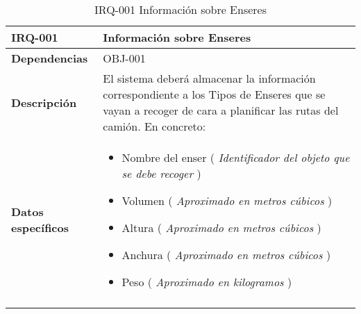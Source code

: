 \begin{center}
\begin{longtable}{|p{80pt}|p{9cm}|}
\hline
\textbf{IRQ-001} & Información sobre Enseres \\ \hline
\textbf{Dependencias} & OBJ-001 \\ \hline
\textbf{Descripción} & El sistema deberá almacenar la información correspondiente a los Tipos de Enseres que se vayan a recoger de cara a planificar las rutas del camión. En concreto: \\ \hline
\textbf{Datos \mbox{específicos}} & 
\begin{itemize}
    \item Nombre del enser ( \textit{Identificador del objeto que se debe recoger} )
    \item Volumen ( \textit{Aproximado en metros cúbicos} )
    \item Altura ( \textit{Aproximado en metros cúbicos} )
    \item Anchura ( \textit{Aproximado en metros cúbicos} )
    \item Peso ( \textit{Aproximado en kilogramos} )
\end{itemize}\\ \hline
\caption{IRQ-001  Información sobre Enseres}
\end{longtable}
\end{center}